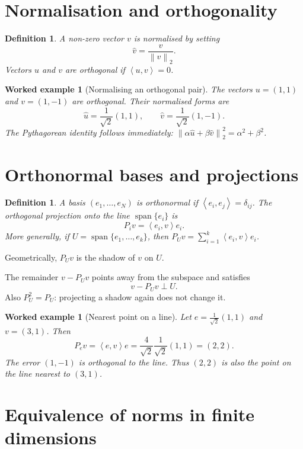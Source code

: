 \documentclass[11pt,a5paper,oneside,openany]{scrreprt}
\theoremstyle{notes}
\theoremstyle{definitions}
\newtheorem{definition}[theorem]{Definition}
\newtheorem{example}[theorem]{Worked example}
\newcommand{\ip}[2]{\left\langle #1,#2\right\rangle}
\newcommand{\norm}[1]{\left\lVert #1\right\rVert}
\newcommand{\Span}{\operatorname{span}}
\begin{document}
\section{Normalisation and orthogonality}

\begin{definition}
A non-zero vector $v$ is normalised by setting
\[
  \widehat v=\frac{v}{\norm{v}_2}.
\]
Vectors $u$ and $v$ are orthogonal if $\ip{u}{v}=0$.
\end{definition}

\begin{example}[Normalising an orthogonal pair]
The vectors $u=(1,1)$ and $v=(1,-1)$ are orthogonal.  Their normalised forms
are
\[
  \widehat u=\frac1{\sqrt2}(1,1),
  \qquad
  \widehat v=\frac1{\sqrt2}(1,-1).
\]
The Pythagorean identity follows immediately:
$\norm{\alpha\widehat u+\beta\widehat v}_2^2=\alpha^2+\beta^2$.
\end{example}

\newpage
\section{Orthonormal bases and projections}

\begin{definition}
A basis $(e_1,\ldots,e_N)$ is orthonormal if
$\ip{e_i}{e_j}=\delta_{ij}$.  The orthogonal projection onto the line
$\Span\{e_i\}$ is
\[
  \boxed{P_i v=\ip{e_i}{v}e_i}.
\]
More generally, if $U=\Span\{e_1,\ldots,e_k\}$, then
$P_Uv=\sum_{i=1}^k\ip{e_i}{v}e_i$.
\end{definition}

Geometrically, $P_Uv$ is the shadow of $v$ on $U$.

The remainder $v-P_Uv$ points away from the subspace and satisfies
\[
  v-P_Uv\perp U.
\]
Also $P_U^2=P_U$: projecting a shadow again does not change it.

\begin{example}[Nearest point on a line]
Let $e=\frac1{\sqrt2}(1,1)$ and $v=(3,1)$.  Then
\[
 P_ev=\ip{e}{v}e=\frac4{\sqrt2}\frac1{\sqrt2}(1,1)=(2,2).
\]
The error $(1,-1)$ is orthogonal to the line.  Thus $(2,2)$ is also the point
on the line nearest to $(3,1)$.
\end{example}

\section{Equivalence of norms in finite dimensions}
\end{document}

